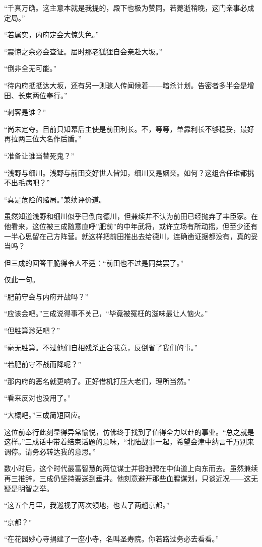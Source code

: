 \documentclass[
]{book}
\begin{document}
``千真万确。这主意本就是我提的，殿下也极为赞同。若薨逝稍晚，这门亲事必成定局。''

``若属实，内府定会大惊失色。''

``震惊之余必会查证。届时那老狐狸自会亲赴大坂。''

``倒非全无可能。''

``待内府抵抵达大坂，还有另一则骇人传闻候着------暗杀计划。告密者多半会是增田、长束两位奉行。''

``刺客是谁？''

``尚未定夺。目前只知幕后主使是前田利长。不，等等，单靠利长不够稳妥，最好再拉两三位大名作后盾。''

``准备让谁当替死鬼？''

``浅野与细川。浅野与前田交好世人皆知，细川又是姻亲。如何？这组合任谁都挑不出毛病吧？''

``真是危险的赌局。''兼续评价道。

虽然知道浅野和细川似乎已倒向德川，但兼续并不认为前田已经抛弃了丰臣家。在他看来，这位被三成随意直呼''肥前''的中年武将，或许立场有所动摇，但至少还有一半心思留在己方阵营。就这样把前田推出去给德川，连确凿证据都没有，真的妥当吗？

但三成的回答干脆得令人不适：``前田也不过是同类罢了。''

仅此一句。

``肥前守会与内府开战吗？''

``应该会吧。''三成说得事不关己，``毕竟被冤枉的滋味最让人恼火。''

``但胜算渺茫吧？''

``毫无胜算。不过他们自相残杀正合我意，反倒省了我们的事。''

``若肥前守不战而降呢？''

``那内府的恶名就更响了。正好借机打压大老们，理所当然。''

``看来反对也没用了。''

``大概吧。''三成简短回应。

这位前奉行此刻显得异常愉悦，仿佛终于找到了值得全力以赴的事业。``总之就是这样。''三成话中带着结束话题的意味，``北陆战事一起，希望会津中纳言千万别来调停。请务必转达我的意思。''

数小时后，这个时代最富智慧的两位谋士并辔驰骋在中仙道上向东而去。虽然兼续再三推辞，三成仍坚持要送到垂井。他刻意避开那些血腥谋划，只谈近况------这无疑是明智之举。

``这五个月里，我巡视了两次领地，也去了两趟京都。''

``京都？''

``在花园妙心寺捐建了一座小寺，名叫圣寿院。你若路过务必去看看。''
\end{document}
